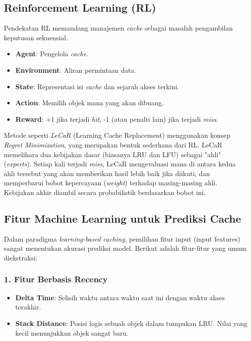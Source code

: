 \subsection{Reinforcement Learning (RL)}
Pendekatan RL memandang manajemen \textit{cache} sebagai masalah
pengambilan keputusan sekuensial.
\begin{itemize}
  \item \textbf{Agent}: Pengelola \textit{cache}.
  \item \textbf{Environment}: Aliran permintaan data.
  \item \textbf{State}: Representasi isi \textit{cache} dan sejarah
    akses terkini.
  \item \textbf{Action}: Memilih objek mana yang akan dibuang.
  \item \textbf{Reward}: +1 jika terjadi \textit{hit}, -1 (atau
    penalti lain) jika terjadi \textit{miss}.
\end{itemize}
Metode seperti \textit{LeCaR} (Learning Cache Replacement) menggunakan
konsep \textit{Regret Minimization}, yang merupakan bentuk sederhana dari
RL. LeCaR memelihara dua kebijakan dasar (biasanya LRU dan LFU) sebagai
"ahli" (\textit{experts}). Setiap kali terjadi \textit{miss}, LeCaR mengevaluasi
mana di antara kedua ahli tersebut yang akan memberikan hasil lebih baik
jika diikuti, dan memperbarui bobot kepercayaan (\textit{weight}) terhadap
masing-masing ahli. Kebijakan akhir diambil secara probabilistik
berdasarkan bobot ini.

\subsection{Fitur Machine Learning untuk Prediksi Cache}
Dalam paradigma \textit{learning-based caching}, pemilihan fitur
input (input features) sangat menentukan akurasi prediksi model.
Berikut adalah fitur-fitur yang umum diekstraksi:

\subsubsection{1. Fitur Berbasis Recency}
\begin{itemize}
  \item \textbf{Delta Time}: Selisih waktu antara waktu saat ini
    dengan waktu akses terakhir.
  \item \textbf{Stack Distance}: Posisi logis sebuah objek dalam
    tumpukan LRU. Nilai yang kecil menunjukkan objek sangat baru.
\end{itemize}

